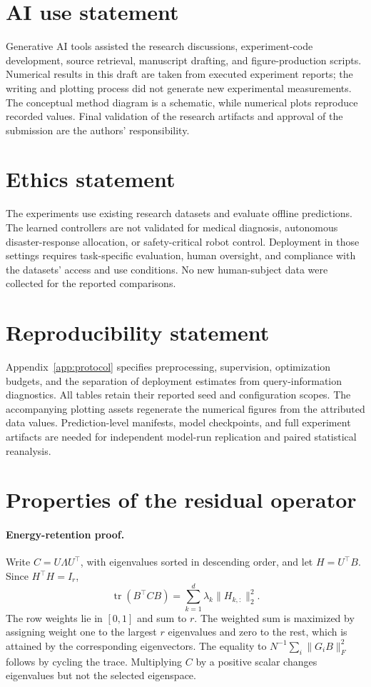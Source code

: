 \documentclass{article}
\newcommand{\tr}{\operatorname{tr}}
\begin{document}
\clearpage
\section*{AI use statement}
Generative AI tools assisted the research discussions, experiment-code development, source retrieval, manuscript drafting, and figure-production scripts. Numerical results in this draft are taken from executed experiment reports; the writing and plotting process did not generate new experimental measurements. The conceptual method diagram is a schematic, while numerical plots reproduce recorded values. Final validation of the research artifacts and approval of the submission are the authors' responsibility.

\section*{Ethics statement}
The experiments use existing research datasets and evaluate offline predictions. The learned controllers are not validated for medical diagnosis, autonomous disaster-response allocation, or safety-critical robot control. Deployment in those settings requires task-specific evaluation, human oversight, and compliance with the datasets' access and use conditions. No new human-subject data were collected for the reported comparisons.

\section*{Reproducibility statement}
Appendix~\ref{app:protocol} specifies preprocessing, supervision, optimization budgets, and the separation of deployment estimates from query-information diagnostics. All tables retain their reported seed and configuration scopes. The accompanying plotting assets regenerate the numerical figures from the attributed data values. Prediction-level manifests, model checkpoints, and full experiment artifacts are needed for independent model-run replication and paired statistical reanalysis.




\clearpage
\appendix
\section{Properties of the residual operator}
\label{app:proof}
\paragraph{Energy-retention proof.}
Write $C=U\Lambda U^\top$, with eigenvalues sorted in descending order, and let $H=U^\top B$. Since $H^\top H=I_r$,
\begin{equation}
 \tr(B^\top CB)=\sum_{k=1}^{d}\lambda_k\|H_{k,:}\|_2^2.
\end{equation}
The row weights lie in $[0,1]$ and sum to $r$. The weighted sum is maximized by assigning weight one to the largest $r$ eigenvalues and zero to the rest, which is attained by the corresponding eigenvectors. The equality to $N^{-1}\sum_i\|G_iB\|_F^2$ follows by cycling the trace. Multiplying $C$ by a positive scalar changes eigenvalues but not the selected eigenspace.
\end{document}
